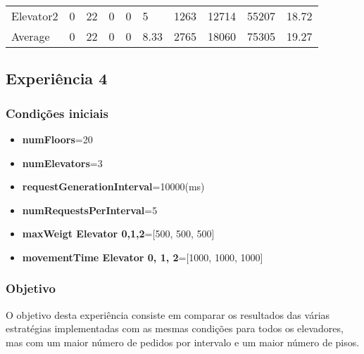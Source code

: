 ﻿\documentclass[a4paper]{article}
\begin{document}
\begin{table}[h]
\begin{tabular}{@{}llllllllll@{}}
Elevator2 & 0        & 22            & 0           & 0                                                               & 5                                                                  & 1263                                                         & 12714                                                 & 55207                                                   & 18.72         \\
Average   & 0     & 22         & 0        & 0                                                               & 8.33                                                               & 2765                                                         & 18060                                                 &  75305                                                  & 19.27         \\ \bottomrule
\end{tabular}
\end{table}

\subsection{Experiência 4}

\subsubsection{Condições iniciais}

\begin{itemize}
\item \textbf{numFloors}=20
\item \textbf{numElevators}=3
\item \textbf{requestGenerationInterval}=10000(ms)
\item \textbf{numRequestsPerInterval}=5
\item \textbf{maxWeigt Elevator 0,1,2}=[500, 500, 500]
\item \textbf{movementTime Elevator 0, 1, 2}=[1000, 1000, 1000]
\end{itemize}

\subsubsection{Objetivo} 

O objetivo desta experiência consiste em comparar os resultados das várias estratégias implementadas com as mesmas condições para todos os elevadores, mas com um maior número de pedidos por intervalo e um maior número de pisos.
\end{document}
